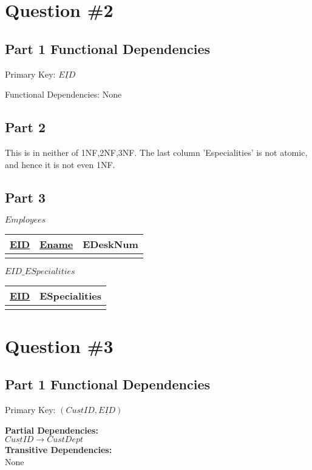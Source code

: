 \documentclass[a4paper,11pt,x11names]{article}
\begin{document}
		
\section{{Question \#2}}
\subsection{Part 1 Functional Dependencies}
    Primary Key: $\underline{EID}$ 
    
	Functional Dependencies: None
	
\subsection{Part 2}
This is in neither of 1NF,2NF,3NF. The last column 'Especialities' is not atomic, and hence it is not even 1NF.
\subsection{Part 3}
    $Employees$
	\begin{tabular}{|c|c|c|}
	\hline \underline{EID} & \underline{Ename}  & EDeskNum  \\ 
	\hline  &  &    \\ 
	\hline 
	\end{tabular} 
	\newline
	$EID\_ESpecialities$
	\begin{tabular}{|c|c|}
		\hline \underline{EID}  & {ESpecialities}   \\ 
		\hline  &    \\ 
		\hline 
	\end{tabular} 
	\newline	



\section{{Question \#3}}
\subsection{Part 1 Functional Dependencies}
    Primary Key: $(\underline{CustID},\underline{EID})$ 
    
    \textbf{Partial Dependencies:} \\
	$\underline{CustID} \longrightarrow CustDept$\\
    
        \textbf{Transitive Dependencies:} \\
None
        
\end{document}

